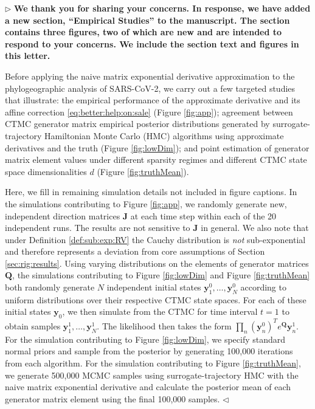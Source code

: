 \documentclass[12pt]{article}
\newenvironment{reply}{$\triangleright$\bfseries}{$\triangleleft$}
\renewenvironment{quote}
               {\list{}{\rightmargin\leftmargin}%
                \item\relax\normalfont}
               {\endlist}
\newcommand{\y}{\mathbf{y}}
\newcommand{\QQ}{\mathbf{Q}}
\newcommand{\JJ}{\mathbf{J}}
\begin{document}
\begin{reply}
We thank you for sharing your concerns.  In response, we have added a new section, ``Empirical Studies'' to the manuscript.   The section contains three figures, two of which are new and are intended to respond to your concerns.   We include the section text and figures in this letter.

\begin{quote}
	Before applying the naive matrix exponential derivative approximation to the phylogeographic analysis of SARS-CoV-2, we carry out a few targeted studies that illustrate: the empirical performance of the approximate derivative and its affine correction \eqref{eq:better:help:on:sale} (Figure \ref{fig:app}); agreement between CTMC generator matrix empirical posterior distributions generated by surrogate-trajectory Hamiltonian Monte Carlo (HMC) algorithms using approximate derivatives and the truth (Figure \ref{fig:lowDim}); and point estimation of generator matrix element values under different sparsity regimes and different CTMC state space dimensionalities $d$ (Figure \ref{fig:truthMean}). 
	
	Here, we fill in remaining simulation details not included in figure captions. In the simulations contributing to Figure \ref{fig:app}, we randomly generate new, independent direction matrices $\JJ$ at each time step within each of the 20 independent runs. The results are not sensitive to $\JJ$ in general.  We also note that under Definition \ref{def:sub:exp:RV} the Cauchy distribution is \emph{not} sub-exponential and therefore represents a deviation from core assumptions of Section \ref{sec:rig:results}.  Using varying distributions on the elements of generator matrices $\QQ$, the simulations contributing to Figure \ref{fig:lowDim} and Figure \ref{fig:truthMean} both randomly generate $N$ independent initial states $\y^0_1,\dots,\y^0_N$ according to uniform distributions over their respective CTMC state spaces. For each of these initial states $\y_0$, we then simulate from the CTMC for time interval $t=1$ to obtain samples $\y^1_1,\dots,\y^1_N$.  The likelihood then takes the form $\prod_n (\y^{0}_n)^T e^{\QQ} \y^{1}_n$.  For the simulation contributing to Figure \ref{fig:lowDim}, we specify standard normal priors and sample from the posterior by generating 100,000 iterations from each algorithm.  For the simulation contributing to Figure \ref{fig:truthMean}, we generate 500,000 MCMC samples using surrogate-trajectory HMC with the naive matrix exponential derivative and calculate the posterior mean of each generator matrix element using the final 100,000 samples.  
\end{quote} 
\end{reply}
\end{document}
